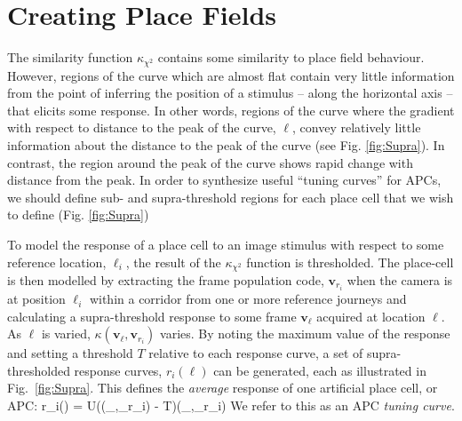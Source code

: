 %



\section{Creating Place Fields}
The similarity function $\kappa_{\chi^2}$ contains some similarity to place field behaviour.  However, regions of the curve which are almost flat contain very little information from the point of inferring the position of a stimulus -- along the horizontal axis -- that elicits some response. In other words, regions of the curve where the gradient with respect to distance to the peak of the curve, $\ell$, convey relatively little information about the distance to the peak of the curve (see Fig. \ref{fig:Supra}). In contrast, the region around the peak of the curve shows rapid change with distance from the peak. In order to synthesize useful ``tuning curves'' for APCs, we should define sub- and supra-threshold regions for each place cell that we wish to define (Fig. \ref{fig:Supra})


To model the response of a place cell to an image stimulus with respect to some reference location, $\ell_i$, the result of the $\kappa_{\chi^2}$ function is thresholded.  The place-cell is then modelled by extracting the frame population code, $\mathbf{v}_{r_i}$ when the camera is at position $\ell_i$ within a corridor from one or more reference journeys and calculating a supra-threshold response to some frame $\mathbf{v}_{\ell}$ acquired at location $\ell$. As $\ell$ is varied, $\kappa(\mathbf{v}_{\ell},\mathbf{v}_{r_i})$ varies.  By noting the maximum value of the response and setting a threshold $T$ relative to each response curve, a set of supra-thresholded response curves, $r_i(\ell)$ can be generated, each as illustrated in Fig.~\ref{fig:Supra}. This defines the {\em average} response of one artificial place cell, or APC:
\be
r_i(\ell) = U(\kappa(_{\ell},_{r_i}) - T)\cdot \kappa(_{\ell},_{r_i})
\ee
We refer to this as an APC {\em tuning curve}.

